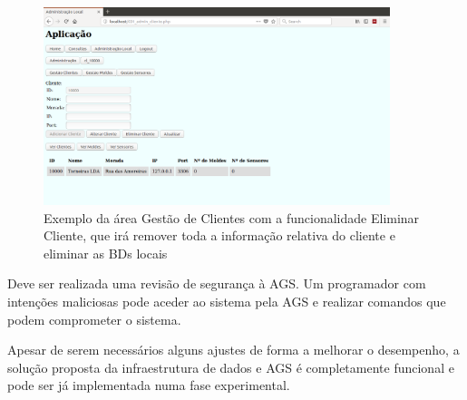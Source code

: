\documentclass[11pt,twoside,a4paper]{report}
\begin{document}
\begin{figure}[H]
	\begin{center}
		\includegraphics[width=0.9\textwidth]{futuro01} %
		\caption[Exemplo da área Gestão de Clientes com a funcionalidade Eliminar Cliente]{Exemplo da área Gestão de Clientes com a funcionalidade Eliminar Cliente, que irá remover toda a informação relativa do cliente e eliminar as BDs locais}
		\label{fig:conclusoes5}
	\end{center}
\end{figure}
Deve ser realizada uma revisão de segurança à AGS. Um programador com intenções maliciosas pode aceder ao sistema pela AGS e realizar comandos que podem comprometer o sistema.\par 
Apesar de serem necessários alguns ajustes de forma a melhorar o desempenho, a solução proposta da infraestrutura de dados e AGS é completamente funcional e pode ser já implementada numa fase experimental.
\end{document}
